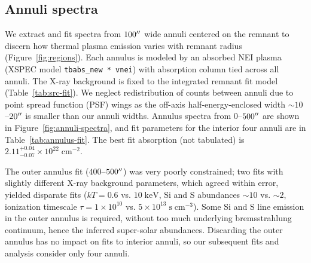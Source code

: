 \documentclass[preprint2,tighten,trackchanges]{aastex6}
\newcommand*{\mt}{\mathrm}
\newcommand*{\unit}[1]{\;\mt{#1}}  %
\newcommand*{\abt}{\mathord{\sim}} %
\newcommand*{\nHUnits}{\times 10^{22} \unit{cm^{-2}}}
\newcommand*{\TauUnits}{\unit{s\;cm^{-3}}}
\begin{document}
\begin{figure*}[!ht]
    \label{fig:src-varyabund}
\end{figure*}

\begin{figure*}[!ht]
    \label{fig:src-varyabund-pn}
\end{figure*}




\subsection{Annuli spectra}

We extract and fit spectra from $100\mbox{$^{\prime\prime}$}$ wide annuli centered on the
remnant to discern how thermal plasma emission varies with remnant radius
(Figure~\ref{fig:regions}).
Each annulus is modeled by an absorbed NEI plasma
(XSPEC model \texttt{tbabs\_new * vnei}) with absorption column tied across
all annuli.
The X-ray background is fixed to the integrated remnant fit model
(Table~\ref{tab:src-fit}).
We neglect redistribution of counts between annuli due to point spread function
(PSF) wings as the off-axis half-energy-enclosed width $\abt10$--$20\mbox{$^{\prime\prime}$}$ is
smaller than our annuli widths.
Annulus spectra from $0$--$500\mbox{$^{\prime\prime}$}$ are shown in
Figure~\ref{fig:annuli-spectra}, and fit parameters for the interior four
annuli are in Table~\ref{tab:annulus-fit}.
The best fit absorption (not tabulated) is $2.11^{+0.04}_{-0.07} \nHUnits$.

The outer annulus fit ($400$--$500\mbox{$^{\prime\prime}$}$) was very poorly constrained;
two fits with slightly different X-ray background parameters, which agreed
within error, yielded disparate fits ($kT = 0.6$ vs. $10 \unit{keV}$,
Si and S abundances $\abt10$ vs. $\abt2$,
ionization timescale $\tau = 1 \times 10^{10}$ vs. $5 \times 10^{13} \TauUnits$).
Some Si and S line emission in the outer annulus is required, without too much
underlying bremsstrahlung continuum, hence the inferred super-solar abundances.
Discarding the outer annulus has no impact on fits to interior annuli, so our
subsequent fits and analysis consider only four annuli.
\end{document}
